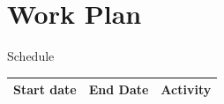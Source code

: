 \documentclass[compress]{beamer}
\begin{document}








\section{Work Plan}
\begin{frame}{Schedule}
\begin{center}
\scriptsize
\begin{tabular}{| l | l | c |}
	\hline
	Start date & End Date & Activity \\
	\hline
	
	\hline
\end{tabular}
\end{center}
\end{frame}
\end{document}
